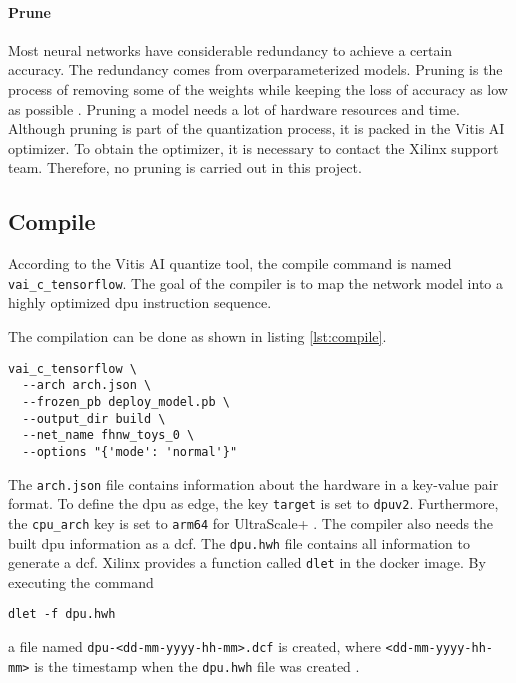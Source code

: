 \paragraph{Prune}
Most neural networks have considerable redundancy to achieve a certain accuracy.
The redundancy comes from overparameterized models.
Pruning is the process of removing some of the weights while keeping the loss of accuracy as low as possible \cite{pruning_overview}.
Pruning a model needs a lot of hardware resources and time.
Although pruning is part of the quantization process, it is packed in the Vitis AI optimizer.
To obtain the optimizer, it is necessary to contact the Xilinx support team.
Therefore, no pruning is carried out in this project.

\subsection{Compile}
\label{subsec:embedded_platform:model_deployment:compile}
According to the Vitis AI quantize tool, the compile command is named \texttt{vai\_c\_tensorflow}.
The goal of the compiler is to map the network model into a highly optimized \acrshort{dpu} instruction sequence.

The compilation can be done as shown in listing \ref{lst:compile}.

\begin{lstlisting}[style=bash, caption={Compilation command}, label=lst:compile]
  vai_c_tensorflow \
  --arch arch.json \
  --frozen_pb deploy_model.pb \
  --output_dir build \
  --net_name fhnw_toys_0 \
  --options "{'mode': 'normal'}"
\end{lstlisting}

The \texttt{arch.json} file contains information about the hardware in a key-value pair format.
To define the \acrshort{dpu} as edge, the key \texttt{target} is set to \texttt{dpuv2}.
Furthermore, the \texttt{cpu\_arch} key is set to \texttt{arm64} for UltraScale+ .
The compiler also needs the built \acrshort{dpu} information as a \acrfull{dcf}.
The \texttt{dpu.hwh} file contains all information to generate a \acrshort{dcf}.
Xilinx provides a function called \texttt{dlet} in the docker image.
By executing the command
\begin{lstlisting}[style=bash, caption={}, label=lst:dlet]
  dlet -f dpu.hwh
\end{lstlisting}
a file named \texttt{dpu-<dd-mm-yyyy-hh-mm>.dcf} is created, where \texttt{<dd-mm-yyyy-hh-mm>} is the timestamp when the \texttt{dpu.hwh} file was created \cite{vitis_ai_user_guide}.

